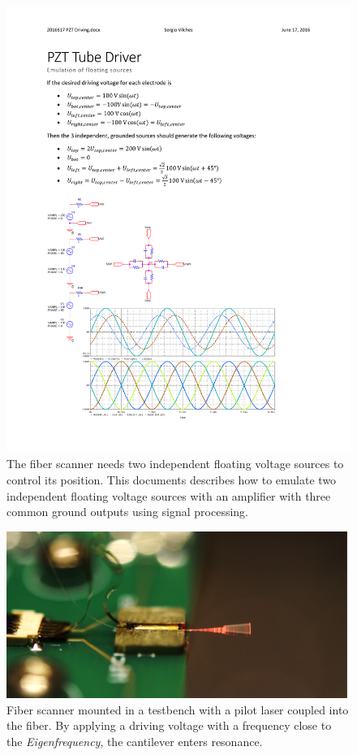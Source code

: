 \begin{figure}[h!]\centering \includegraphics[width=16cm]{appendix/driving.pdf}
      \caption{The fiber scanner needs two independent floating voltage sources to control its position. This documents describes how to emulate two independent floating voltage sources with an amplifier with three common ground outputs using signal processing.}
\end{figure}
\begin{figure}[h!]\centering \includegraphics[width=15cm]{appendix/vibrating.png}
      \caption{Fiber scanner mounted in a testbench with a pilot laser coupled into the fiber. By applying a driving voltage with a frequency close to the \textit{Eigenfrequency}, the cantilever enters resonance.}
\end{figure}

